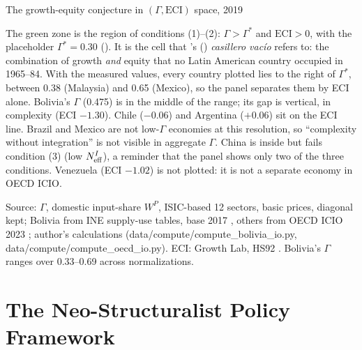 \documentclass[../structural_economics_book.tex]{subfiles}
\begin{document}
\begin{vizpanel}{The growth-equity conjecture in $(\Gamma, \text{ECI})$ space, 2019}
\begin{center}
\end{center}
\vspace{-0.5em}
\small The green zone is the region of conditions (1)--(2): $\Gamma > \Gamma^*$ and $\text{ECI} > 0$, with the placeholder $\Gamma^* = 0.30$ (\illustrative). It is the cell that \citeauthor{fajnzylber1990industrializacion}'s (\citeyear{fajnzylber1990industrializacion}) \textit{casillero vac\'{i}o} refers to: the combination of growth \emph{and} equity that no Latin American country occupied in 1965--84. With the measured values, every country plotted lies to the right of $\Gamma^*$, between 0.38 (Malaysia) and 0.65 (Mexico), so the panel separates them by ECI alone. Bolivia's $\Gamma$ (0.475) is in the middle of the range; its gap is vertical, in complexity (ECI $-1.30$). Chile ($-0.06$) and Argentina ($+0.06$) sit on the ECI line. Brazil and Mexico are not low-$\Gamma$ economies at this resolution, so ``complexity without integration'' is not visible in aggregate $\Gamma$. China is inside but fails condition (3) (low $N_{\text{eff}}^I$), a reminder that the panel shows only two of the three conditions. Venezuela (ECI $-1.02$) is not plotted: it is not a separate economy in OECD ICIO.
\par\footnotesize Source: $\Gamma$, domestic input-share $W^P$, ISIC-based 12 sectors, basic prices, diagonal kept; Bolivia from INE supply-use tables, base 2017 \citep{ine2026sut}, others from OECD ICIO 2023 \citep{oecd2023icio}; author's calculations (data/compute/compute\_bolivia\_io.py, data/compute/compute\_oecd\_io.py). ECI: Growth Lab, HS92 \citep{growthlab2026atlas}. Bolivia's $\Gamma$ ranges over 0.33--0.69 across normalizations.
\end{vizpanel}


\section{The Neo-Structuralist Policy Framework}
\label{ch26:sec:framework}
\end{document}
